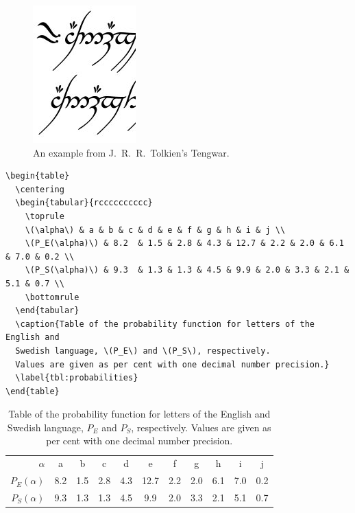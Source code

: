 \begin{frame}
	\begin{figure}
		\centering
		\includegraphics[width=0.2\linewidth]{tengwar.jpg}
    \caption{An example from J.~R.~R.~Tolkien's Tengwar.}
    \label{fig:bild}
	\end{figure}
\end{frame}

\begin{frame}
	\begin{lstlisting}
\begin{table}
  \centering
  \begin{tabular}{rcccccccccc}
    \toprule
    \(\alpha\) & a & b & c & d & e & f & g & h & i & j \\
    \(P_E(\alpha)\) & 8.2  & 1.5 & 2.8 & 4.3 & 12.7 & 2.2 & 2.0 & 6.1 & 7.0 & 0.2 \\
    \(P_S(\alpha)\) & 9.3  & 1.3 & 1.3 & 4.5 & 9.9 & 2.0 & 3.3 & 2.1 & 5.1 & 0.7 \\
    \bottomrule
  \end{tabular}
  \caption{Table of the probability function for letters of the English and 
  Swedish language, \(P_E\) and \(P_S\), respectively.
  Values are given as per cent with one decimal number precision.}
  \label{tbl:probabilities}
\end{table}
	\end{lstlisting}
\end{frame}

\begin{frame}
\begin{table}
  \centering
  \begin{tabular}{rcccccccccc}
    \toprule
    \(\alpha\) & a & b & c & d & e & f & g & h & i & j \\
    \(P_E(\alpha)\) & 8.2  & 1.5 & 2.8 & 4.3 & 12.7 & 2.2 & 2.0 & 6.1 & 7.0 & 0.2 \\
    \(P_S(\alpha)\) & 9.3  & 1.3 & 1.3 & 4.5 & 9.9 & 2.0 & 3.3 & 2.1 & 5.1 & 0.7 \\
    \bottomrule
  \end{tabular}
  \caption{Table of the probability function for letters of the English and 
  Swedish language, \(P_E\) and \(P_S\), respectively.
  Values are given as per cent with one decimal number precision.}
  \label{tbl:probabilities}
\end{table}
\end{frame}


